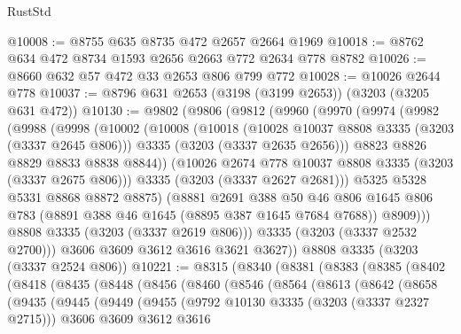 \begin{lexlean}{RustStd}
\begin{coremodule}
{\begin{coremodule}
{{{{{{{{{{{{{{{@10008 := @8755 @635 @8735 @472 @2657 @2664 @1969
@10018 := @8762 @634 @472 @8734 @1593 @2656 @2663 @772 @2634 @778 @8782
@10026 := @8660 @632 @57 @472 @33 @2653 @806 @799 @772
@10028 := @10026 @2644 @778
@10037 := @8796 @631 @2653 (@3198 (@3199 @2653)) (@3203 (@3205 @631 @472))
@10130 := @9802
    (@9806
      (@9812
        (@9960
          (@9970
            (@9974
              (@9982
                (@9988
                  (@9998
                    (@10002
                      (@10008
                        (@10018
                          (@10028 @10037 @8808 @3335 (@3203 (@3337 @2645 @806)))
                          @3335
                          (@3203 (@3337 @2635 @2656)))
                        @8823
                        @8826
                        @8829
                        @8833
                        @8838
                        @8844))
                    (@10026 @2674 @778 @10037 @8808 @3335 (@3203 (@3337 @2675 @806)))
                    @3335
                    (@3203 (@3337 @2627 @2681)))
                  @5325
                  @5328
                  @5331
                  @8868
                  @8872
                  @8875)
                (@8881
                  @2691
                  @388
                  @50
                  @46
                  @806
                  @1645
                  @806
                  @783
                  (@8891 @388 @46 @1645 (@8895 @387 @1645 @7684 @7688))
                  @8909)))
            @8808
            @3335
            (@3203 (@3337 @2619 @806)))
          @3335
          (@3203 (@3337 @2532 @2700)))
        @3606
        @3609
        @3612
        @3616
        @3621
        @3627))
    @8808
    @3335
    (@3203 (@3337 @2524 @806))
@10221 := @8315
    (@8340
      (@8381
        (@8383
          (@8385
            (@8402
              (@8418
                (@8435
                  (@8448
                    (@8456
                      (@8460
                        (@8546
                          (@8564
                            (@8613
                              (@8642
                                (@8658
                                  (@9435
                                    (@9445
                                      (@9449
                                        (@9455
                                          (@9792 @10130 @3335 (@3203 (@3337 @2327 @2715)))
                                          @3606
                                          @3609
                                          @3612
                                          @3616
}}}}}}}}}}}}}}}
\end{coremodule}}
\end{coremodule}
\end{lexlean}
